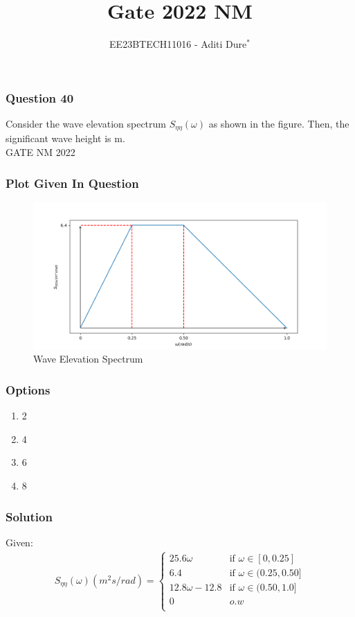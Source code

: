\documentclass{beamer}
\begin{document}
\title{Gate 2022 NM}
\author{EE23BTECH11016 - Aditi Dure$^{*}$}
\date{}
\frame{\titlepage}

\begin{frame}
\frametitle{Question 40}
Consider the wave elevation spectrum $S_{\eta \eta}(\omega)$ as shown in the figure. Then, the significant wave height is \underline{\hspace{3cm}} m. \\
\hfill{GATE NM 2022}
\end{frame}

\begin{frame}
\frametitle{Plot Given In Question}
\begin{figure}[H]
    \centering
    \includegraphics[width=\columnwidth]{./figs/qfig.png}
    \caption{Wave Elevation Spectrum}
    \label{fig: GATE22NM40.1}
\end{figure}
\end{frame}

\begin{frame}
\frametitle{Options}
\begin{enumerate}
\item 2
\item 4
\item 6
\item 8
\end{enumerate}
\end{frame}

\begin{frame}
\frametitle{Solution}
Given:
\begin{align}
S_{\eta \eta}(\omega)(m^2s/rad) = 
\begin{cases}
  25.6\omega   & \text{if } \omega \in [0,0.25] \\
  6.4  & \text{if } \omega \in (0.25,0.50] \\
  12.8\omega-12.8  & \text{if } \omega \in (0.50,1.0] \\
  0  & o.w \\
\end{cases}
\end{align}
\end{frame}
\end{document}
